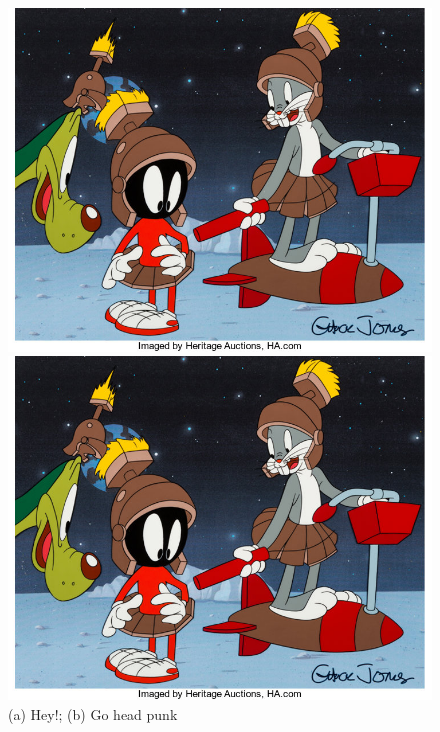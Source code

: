 \documentclass[a4paper, 11pt]{article}
\begin{document}
\begin{figure}[ht!]
  \begin{minipage}[c]{.49\linewidth}
   \centering
   \includegraphics[width=\linewidth]{picture.jpg}
  \end{minipage} \hfill
  \begin{minipage}[c]{.49\linewidth}
   \centering
   \includegraphics[width=\linewidth]{picture.jpg}
  \end{minipage}
  \caption{(a) Hey!; (b) Go head punk}
  \label{fig::example::two}
\end{figure}
\end{document}
